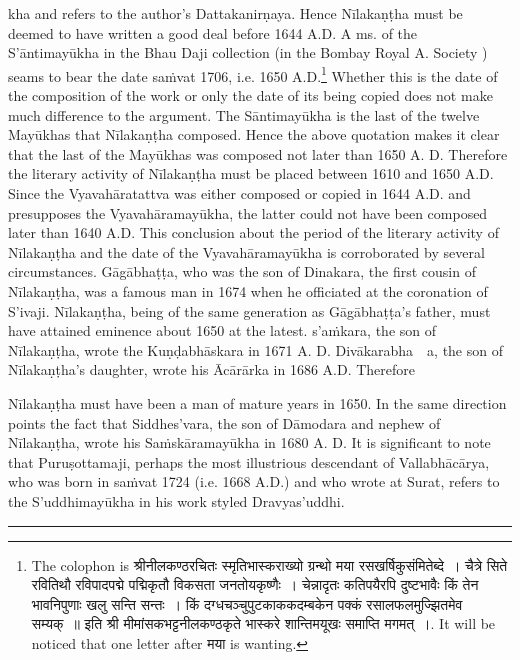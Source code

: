 \documentclass[11pt, openany]{book}
\begin{document}
\noindent
kha and refers to the author's Dattakanirṇaya. Hence Nīlakaṇṭha must be deemed to have written a good deal before 1644 A.D. A ms. of the S'āntimayūkha in the Bhau Daji collection (in the Bombay Royal A. Society ) seams to bear the date saṁvat 1706, i.e. 1650 A.D.\renewcommand{\thefootnote}{1}\footnote{The colophon is श्रीनीलकण्ठरचितः स्मृतिभास्कराख्यो ग्रन्थो मया रसखर्षिकुसंमितेब्दे~। चैत्रे सिते रवितिथौ रविपादपद्मे पद्मिकृतौ विकसता जनतोयकृष्णैः~। चेन्नादृतः कतिपयैरपि दुष्टभावैः किं तेन भावनिपुणाः खलु सन्ति सन्तः~। किं दग्धचञ्चुपुटकाककदम्बकेन पक्कं रसालफलमुज्झितमेव सम्यक्~॥ इति श्री मीमांसकभट्टनीलकण्ठकृते भास्करे शान्तिमयूखः समाप्ति मगमत्~।. It will be noticed that one letter after मया is wanting.} Whether this is the date of the composition of the work or only the date of its being copied does not make much difference to the argument. The Sāntimayūkha is the last of the twelve Mayūkhas that Nīlakaṇṭha composed. Hence the above quotation makes it clear that the last of the Mayūkhas was composed not later than 1650 A. D. Therefore the literary activity of Nīlakaṇṭha must be placed between 1610 and 1650 A.D. Since the Vyavahāratattva was either composed or copied in 1644 A.D. and presupposes the Vyavahāramayūkha, the latter could not have been composed later than 1640 A.D. This conclusion about the period of the literary activity of Nīlakaṇṭha and the date of the Vyavahāramayūkha is corroborated by several circumstances. Gāgābhaṭṭa, who was the son of Dinakara, the first cousin of Nīlakaṇṭha, was a famous man in 1674 when he officiated at the coronation of S'ivaji. Nīlakaṇṭha, being of the same generation as Gāgābhaṭṭa's father, must have attained eminence about 1650 at the latest. s'aṁkara, the son of Nīlakaṇṭha, wrote the Kuṇḍabhāskara in 1671 A. D. Divākarabha~~a, the son of Nīlakaṇṭha's daughter, wrote his Ācārārka in 1686 A.D. Therefore

\newpage

\noindent
Nīlakaṇṭha must have been a man of mature years in 1650. In the same direction points the fact that Siddhes'vara, the son of Dāmodara and nephew of Nīlakaṇṭha, wrote his Saṁskāramayūkha in 1680 A. D. It is significant to note that Puruṣottamaji, perhaps the most illustrious descendant of Vallabhācārya, who was born in saṁvat 1724 (i.e. 1668 A.D.) and who wrote at Surat, refers to the S'uddhimayūkha in his work styled Dravyas'uddhi.

\vspace{2cm}
\begin{center}
\rule{0.2\linewidth}{0.5pt}
\end{center}
\end{document}
